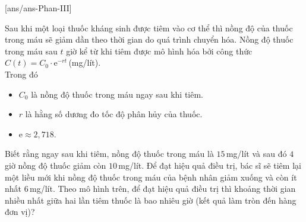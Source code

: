 \caukq
{}[ans/ans\currfilebase-Phan-III]
\begin{ex}%
	Sau khi một loại thuốc kháng sinh được tiêm vào cơ thể thì nồng độ của thuốc trong máu sẽ giảm dần theo thời gian do quá trình chuyển hóa. Nồng độ thuốc trong máu sau $t$ giờ kể từ khi tiêm được mô hình hóa bởi công thức $C(t) = C_0 \cdot \mathrm{e}^{-rt}$\,(mg/lít).\\
	Trong đó 
	\begin{itemize}
		\item $C_0$ là nồng độ thuốc trong máu ngay sau khi tiêm.
		\item $r$ là hằng số dương đo tốc độ phân hủy của thuốc.
		\item $\mathrm{e}\approx 2{,}718$.
	\end{itemize}   
	Biết rằng ngay sau khi tiêm, nồng độ thuốc trong máu là $15$\,mg/lít và sau đó $4$ giờ nồng độ thuốc giảm còn $10$\,mg/lít. Để đạt hiệu quả điều trị, bác sĩ sẽ tiêm lại một liều mới khi nồng độ thuốc trong máu của bệnh nhân giảm xuống và còn ít nhất $6$\,mg/lít. Theo mô hình trên, để đạt hiệu quả điều trị thì khoảng thời gian nhiều nhất giữa hai lần tiêm thuốc là bao nhiêu giờ (kết quả làm tròn đến hàng đơn vị)?
	\par
\end{ex}


